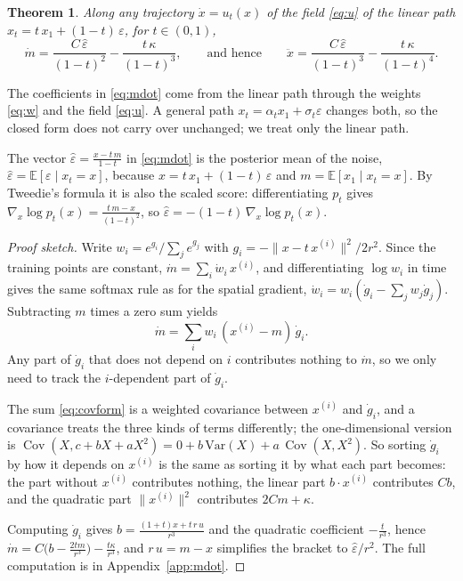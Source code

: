 \documentclass{article}
\newtheorem{theorem}{Theorem}
\theoremstyle{remark}
\newcommand{\E}{\mathbb{E}}
\newcommand{\Cov}{\operatorname{Cov}}
\newcommand{\xn}[1]{x^{(#1)}}
\newcommand{\eps}{\hat\varepsilon}
\begin{document}
\begin{theorem}\label{thm:mdot}
Along any trajectory $\dot x = u_t(x)$ of the field \eqref{eq:u} of the linear path $x_t = t\,x_1 + (1 - t)\,\varepsilon$, for $t \in (0,1)$,
\begin{equation}\label{eq:mdot}
  \dot m = \frac{C\,\eps}{(1 - t)^2} - \frac{t\,\kappa}{(1 - t)^3},
  \qquad\text{and hence}\qquad
  \ddot x = \frac{C\,\eps}{(1 - t)^3} - \frac{t\,\kappa}{(1 - t)^4}.
\end{equation}
\end{theorem}

The coefficients in \eqref{eq:mdot} come from the linear path through the weights \eqref{eq:w} and the field \eqref{eq:u}. A general path $x_t = \alpha_t x_1 + \sigma_t\varepsilon$ changes both, so the closed form does not carry over unchanged; we treat only the linear path.

The vector $\eps = \frac{x - t\,m}{1 - t}$ in \eqref{eq:mdot} is the posterior mean of the noise, $\eps = \E[\varepsilon \mid x_t = x]$, because $x = t\,x_1 + (1 - t)\,\varepsilon$ and $m = \E[x_1 \mid x_t = x]$. By Tweedie's formula \citep{efron2011tweedie} it is also the scaled score: differentiating $p_t$ gives $\nabla_x\log p_t(x) = \frac{t\,m - x}{(1 - t)^2}$, so $\eps = -(1 - t)\,\nabla_x\log p_t(x)$.

\begin{proof}[Proof sketch]
Write $w_i = e^{g_i}/\sum_je^{g_j}$ with $g_i = -\|x - t\,\xn{i}\|^2/2r^2$. Since the training points are constant, $\dot m = \sum_i\dot w_i\,\xn{i}$, and differentiating $\log w_i$ in time gives the same softmax rule as for the spatial gradient, $\dot w_i = w_i(\dot g_i - \sum_jw_j\dot g_j)$. Subtracting $m$ times a zero sum yields
\begin{equation}\label{eq:covform}
  \dot m = \sum_iw_i\,(\xn{i} - m)\,\dot g_i .
\end{equation}
Any part of $\dot g_i$ that does not depend on $i$ contributes nothing to $\dot m$, so we only need to track the $i$-dependent part of $\dot g_i$.

The sum \eqref{eq:covform} is a weighted covariance between $\xn{i}$ and $\dot g_i$, and a covariance treats the three kinds of terms differently; the one-dimensional version is $\Cov(X,c + bX + aX^2) = 0 + b\,\mathrm{Var}(X) + a\,\Cov(X,X^2)$. So sorting $\dot g_i$ by how it depends on $\xn{i}$ is the same as sorting it by what each part becomes: the part without $\xn{i}$ contributes nothing, the linear part $b \cdot \xn{i}$ contributes $Cb$, and the quadratic part $\|\xn{i}\|^2$ contributes $2Cm + \kappa$.

Computing $\dot g_i$ gives $b = \frac{(1 + t)x + t\,r\,u}{r^3}$ and the quadratic coefficient $-\frac{t}{r^3}$, hence $\dot m = C\big(b - \frac{2tm}{r^3}\big) - \frac{t\kappa}{r^3}$, and $r\,u = m - x$ simplifies the bracket to $\eps/r^2$. The full computation is in Appendix~\ref{app:mdot}.
\end{proof}
\end{document}
